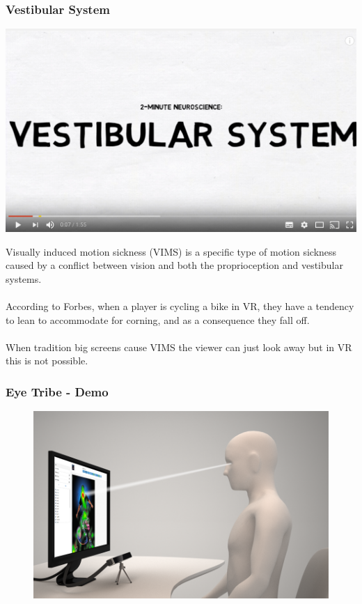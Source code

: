 \begin{frame}
	\frametitle{Vestibular System}
	\begin{center}
		\href{https://www.youtube.com/watch?v=P3aYqxGesqs}{\includegraphics[scale=.3]{assets/vestibular} }
	\end{center}
\end{frame}

\begin{frame}
	Visually induced motion sickness (VIMS) is a specific type of motion sickness caused by a conflict between vision and both the proprioception and vestibular systems.  \\~\\
	
	According to Forbes, when a player is cycling a bike in VR, they have a tendency to lean to accommodate for corning, and as a consequence they fall off. \\~\\
	
	When tradition big screens cause VIMS the viewer can just look away but in VR this is not possible. 
	

\end{frame}

\begin{frame}
	\frametitle{Eye Tribe - Demo}
	
	\begin{figure}
		\includegraphics[scale=.3]{assets/tribe} 
		
	\end{figure}
	 
\end{frame}

